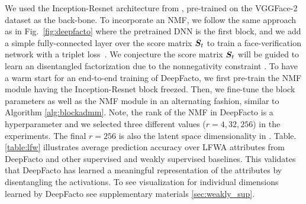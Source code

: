 We used the Inception-Resnet architecture from \cite{schroff2015facenet}, pre-trained on the VGGFace-2 \cite{Cao18} dataset as the back-bone. To incorporate an NMF, we follow the same approach as in Fig.~\ref{fig:deepfacto} where the pretrained DNN is the first block, and we add a simple fully-connected layer over the score matrix ${\bm{S}}_t$ to train a face-verification network with a triplet loss~\cite{hoffer2015deep}.
We conjecture the score matrix ${\bm{S}}_t$ will be guided to learn an disentangled factorization due to the nonnegativity constraint \cite{collins2018deep}. 
To have a warm start for an end-to-end training of DeepFacto, we first pre-train the NMF module having the Inception-Resnet block freezed. Then, we fine-tune the block parameters as well as the NMF module in an alternating fashion, similar to Algorithm \ref{alg:blockadmm}. Note, the rank of the NMF in DeepFacto is a hyperparameter and we selected three different values ($r=4, 32, 256$) in the experiments. The final $r=256$ is also the latent space dimensionality in \cite{liu2018exploring}.
Table. \ref{table:lfw} illustrates average prediction accuracy over LFWA attributes
from DeepFacto and other supervised and weakly supervised baselines. This validates that DeepFacto has learned a meaningful representation of the attributes by disentangling the activations. To see visualization for individual dimensions learned by DeepFacto see supplementary materials \ref{sec:weakly_sup}.%




